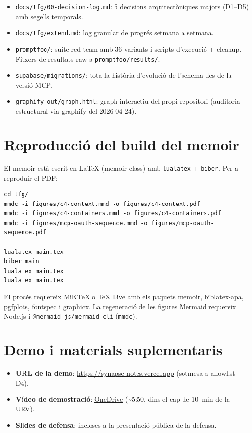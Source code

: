 \begin{itemize}
    \item \texttt{docs/tfg/00-decision-log.md}: 5 decisions arquitectòniques majors (D1--D5) amb segells temporals.
    \item \texttt{docs/tfg/extend.md}: log granular de progrés setmana a setmana.
    \item \texttt{promptfoo/}: suite red-team amb 36 variants i scripts d'execució + cleanup. Fitxers de resultats raw a \texttt{promptfoo/results/}.
    \item \texttt{supabase/migrations/}: tota la història d'evolució de l'schema des de la versió MCP.
    \item \texttt{graphify-out/graph.html}: graph interactiu del propi repositori (auditoria estructural via graphify del 2026-04-24).
\end{itemize}

\section*{Reproducció del build del memoir}

El memoir està escrit en LaTeX (memoir class) amb \texttt{lualatex} + \texttt{biber}. Per a reproduir el PDF:

\begin{verbatim}
cd tfg/
mmdc -i figures/c4-context.mmd -o figures/c4-context.pdf
mmdc -i figures/c4-containers.mmd -o figures/c4-containers.pdf
mmdc -i figures/mcp-oauth-sequence.mmd -o figures/mcp-oauth-sequence.pdf

lualatex main.tex
biber main
lualatex main.tex
lualatex main.tex
\end{verbatim}

El procés requereix MiKTeX o TeX Live amb els paquets memoir, biblatex-apa, pgfplots, fontspec i graphicx. La regeneració de les figures Mermaid requereix Node.js i \texttt{@mermaid-js/mermaid-cli} (\texttt{mmdc}).

\section*{Demo i materials suplementaris}

\begin{itemize}
    \item \textbf{URL de la demo}: \url{https://synapse-notes.vercel.app} (sotmesa a allowlist D4).
    \item \textbf{Vídeo de demostració}: \href{https://rovira-my.sharepoint.com/:v:/g/personal/48280130-w_epp_urv_cat/IQDie5xDdq1SSI8_CwVEH8fXAfj1MGzmgZ_T57uCfXrMLHs?nav=eyJyZWZlcnJhbEluZm8iOnsicmVmZXJyYWxBcHAiOiJPbmVEcml2ZUZvckJ1c2luZXNzIiwicmVmZXJyYWxBcHBQbGF0Zm9ybSI6IldlYiIsInJlZmVycmFsTW9kZSI6InZpZXciLCJyZWZlcnJhbFZpZXciOiJNeUZpbGVzTGlua0NvcHkifX0&e=w4l8yr}{OneDrive} (\textasciitilde5:50, dins el cap de 10~min de la URV).
    \item \textbf{Slides de defensa}: incloses a la presentació pública de la defensa.
\end{itemize}
